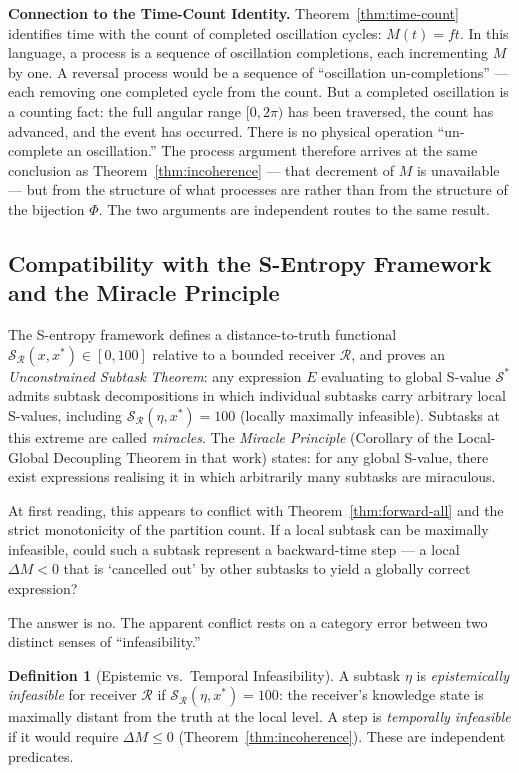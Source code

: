 \documentclass[twocolumn,10pt,a4paper]{article}
\theoremstyle{thmstyle}
\theoremstyle{definition}
\newtheorem{definition}[theorem]{Definition}
\theoremstyle{remark}
\newcommand{\PhiMap}{\varPhi}
\begin{document}
\textbf{Connection to the Time-Count Identity.}
Theorem~\ref{thm:time-count} identifies time with the count of completed oscillation cycles: $M(t) = ft$. In this language, a process is a sequence of oscillation completions, each incrementing $M$ by one. A reversal process would be a sequence of ``oscillation un-completions'' — each removing one completed cycle from the count. But a completed oscillation is a counting fact: the full angular range $[0, 2\pi)$ has been traversed, the count has advanced, and the event has occurred. There is no physical operation ``un-complete an oscillation.'' The process argument therefore arrives at the same conclusion as Theorem~\ref{thm:incoherence} --- that decrement of $M$ is unavailable --- but from the structure of what processes are rather than from the structure of the bijection $\PhiMap$. The two arguments are independent routes to the same result.

\subsection{Compatibility with the S-Entropy Framework and the Miracle Principle}
\label{sec:s-entropy-compat}

The S-entropy framework \citep{sachikonye2024sentropy} defines a distance-to-truth functional $\mathcal{S}_{\mathcal{R}}(x, x^{*}) \in [0, 100]$ relative to a bounded receiver $\mathcal{R}$, and proves an \emph{Unconstrained Subtask Theorem}: any expression $E$ evaluating to global S-value $\mathcal{S}^{*}$ admits subtask decompositions in which individual subtasks carry arbitrary local S-values, including $\mathcal{S}_{\mathcal{R}}(\eta, x^{*}) = 100$ (locally maximally infeasible). Subtasks at this extreme are called \emph{miracles}. The \emph{Miracle Principle} (Corollary of the Local-Global Decoupling Theorem in that work) states: for any global S-value, there exist expressions realising it in which arbitrarily many subtasks are miraculous.

At first reading, this appears to conflict with Theorem~\ref{thm:forward-all} and the strict monotonicity of the partition count. If a local subtask can be maximally infeasible, could such a subtask represent a backward-time step --- a local $\Delta M < 0$ that is `cancelled out' by other subtasks to yield a globally correct expression?

The answer is no. The apparent conflict rests on a category error between two distinct senses of ``infeasibility.''

\begin{definition}[Epistemic vs.\ Temporal Infeasibility]
\label{def:two-infeasibilities}
A subtask $\eta$ is \emph{epistemically infeasible} for receiver $\mathcal{R}$ if $\mathcal{S}_{\mathcal{R}}(\eta, x^{*}) = 100$: the receiver's knowledge state is maximally distant from the truth at the local level. A step is \emph{temporally infeasible} if it would require $\Delta M \leq 0$ (Theorem~\ref{thm:incoherence}). These are independent predicates.
\end{definition}
\end{document}
